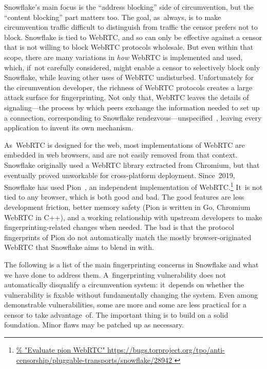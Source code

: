\documentclass[letterpaper,twocolumn]{article}
\newlength{\urlfootnotesize}
\newcommand{\urlfootnote}[1]{\footnote{
\raggedright\fontsize{\urlfootnotesize}{\urlfootnotesize}\selectfont\url{#1}
}}
\begin{document}
Snowflake's main focus is the ``address blocking'' side of circumvention,
but the ``content blocking'' part matters too.
The goal, as~always, is to make circumvention traffic
difficult to distinguish from traffic the censor prefers not to block.
Snowflake is tied to WebRTC,
and so can only be effective against a censor
that is not willing to block WebRTC protocols wholesale.
But even within that scope,
there are many variations in \emph{how}
WebRTC is implemented and used,
which, if~not carefully considered, might enable a censor
to selectively block only Snowflake,
while leaving other uses of WebRTC undisturbed.
Unfortunately for the circumvention developer,
the richness of WebRTC protocols
creates a large attack surface for fingerprinting.
Not only that, WebRTC leaves the details of
signaling---the process by which peers exchange the information
needed to set up a connection,
corresponding to Snowflake rendezvous---unspecified~\cite[\S 3]{rfc8825},
leaving every application to invent its own mechanism.

As~WebRTC is designed for the web,
most implementations of WebRTC are embedded in web browsers,
and are not easily removed from that context.
Snowflake originally used a WebRTC library extracted from Chromium,
but that eventually proved unworkable for cross-platform deployment.
Since~2019, Snowflake has used Pion~\cite{pion-webrtc},
an independent implementation of WebRTC.\urlfootnote{
https://bugs.torproject.org/tpo/anti-censorship/pluggable-transports/snowflake/28942
}
It~is not tied to any browser,
which is both good and bad.
The good features are less development friction,
better memory safety
(Pion is written in Go, Chromium WebRTC in C++),
and a working relationship with upstream developers
to make fingerprinting-related changes when needed.
The bad is that the protocol fingerprints of Pion
do not automatically match the mostly browser-originated
WebRTC that Snowflake aims to blend in with.

The following is a list of the main fingerprinting concerns in Snowflake and
what we have done to address them.
A~fingerprinting vulnerability
does not automatically disqualify a circumvention system:
it~depends on whether the vulnerability is fixable
without fundamentally changing the system.
Even among demonstrable vulnerabilities,
some are more and some are less practical for a censor to take advantage~of.
The important thing is to build on a solid foundation.
Minor flaws may be patched up as necessary.
\end{document}
